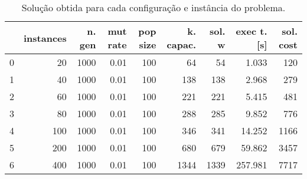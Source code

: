 \documentclass{article}
\begin{document}
\begin{table}
\centering
\begin{tabular}{lrrrrrrrr}
\toprule
{} &  instances &  n. gen &  mut rate &  pop size &  k. capac. &  sol. w &  exec t. [s] &  sol. cost \\
\midrule
0 &         20 &    1000 &      0.01 &       100 &         64 &      54 &        1.033 &        120 \\
1 &         40 &    1000 &      0.01 &       100 &        138 &     138 &        2.968 &        279 \\
2 &         60 &    1000 &      0.01 &       100 &        221 &     221 &        5.415 &        481 \\
3 &         80 &    1000 &      0.01 &       100 &        288 &     285 &        9.852 &        776 \\
4 &        100 &    1000 &      0.01 &       100 &        346 &     341 &       14.252 &       1166 \\
5 &        200 &    1000 &      0.01 &       100 &        680 &     679 &       59.862 &       3457 \\
6 &        400 &    1000 &      0.01 &       100 &       1344 &    1339 &      257.981 &       7717 \\
\bottomrule
\end{tabular}
\caption{Solução obtida para cada configuração e instância do problema.}
\label{table:all-data}
\end{table}
\end{document}
